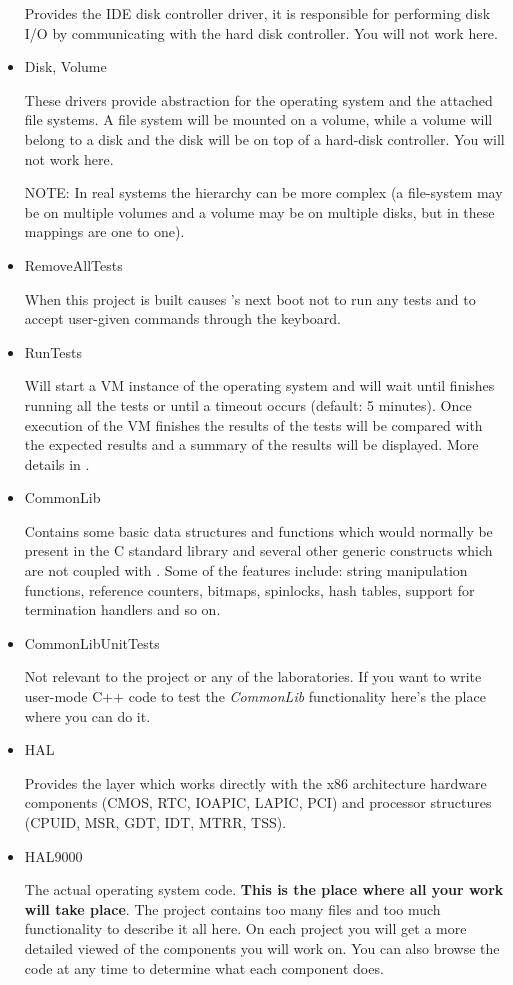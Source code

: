 \begin{itemize}
	Provides the IDE disk controller driver, it is responsible for performing disk I/O by
communicating with the hard disk controller. You will not work here.

	\item Disk, Volume

	These drivers provide abstraction for the operating system and the attached file systems. A file
system will be mounted on a volume, while a volume will belong to a disk and the disk will be
on top of a hard-disk controller. You will not work here.

	NOTE: In real systems the hierarchy can be more complex (a file-system may be on multiple
volumes and a volume may be on multiple disks, but in \projectname these mappings are one to one).

	\item RemoveAllTests

	When this project is built causes \projectname's next boot not to run any tests and to accept
user-given commands through the keyboard.

	\item RunTests

	Will start a VM instance of the operating system and will wait until \projectname finishes
running all the tests or until a timeout occurs (default: 5 minutes). Once execution of the VM
finishes the results of the tests will be compared with the expected results and a summary of the
results will be displayed. More details in .

	\item CommonLib

	Contains some basic data structures and functions which would normally be present in the C
standard library and several other generic constructs which are not coupled with \projectname. Some
of the features include: string manipulation functions, reference counters, bitmaps, spinlocks,
hash tables, support for termination handlers and so on.

	\item CommonLibUnitTests

	Not relevant to the project or any of the laboratories. If you want to write user-mode C++ code
to test the \textit{CommonLib} functionality here's the place where you can do it.

	\item HAL

	Provides the layer which works directly with the x86 architecture hardware components (CMOS,
RTC, IOAPIC, LAPIC, PCI) and processor structures (CPUID, MSR, GDT, IDT, MTRR, TSS).

	\item HAL9000

	The actual operating system code. \textbf{This is the place where all your work will take place}.
The project contains too many files and too much functionality to describe it all here. On each
project you will get a more detailed viewed of the components you will work on. You can also browse
the code at any time to determine what each component does.

\end{itemize}

